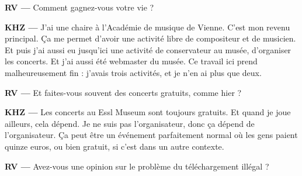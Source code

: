 \documentclass[a4paper,12pt]{article}
\begin{document}
\textbf{RV ---} Comment gagnez-vous votre vie ?

\textbf{KHZ ---} J'ai une chaire à l'Académie de musique de Vienne. C'est mon revenu principal. Ça me permet d'avoir une activité libre de compositeur et de musicien. Et puis j'ai aussi eu jusqu'ici une activité de conservateur au musée, d'organiser les concerts. Et j'ai aussi été webmaster du musée. Ce travail ici prend malheureusement fin : j'avais trois activités, et je n'en ai plus que deux.

\textbf{RV ---} Et faites-vous souvent des concerts gratuits, comme hier ?

\textbf{KHZ ---} Les concerts au Essl Museum sont toujours gratuits. Et quand je joue ailleurs, cela dépend. Je ne suis pas l'organisateur, donc ça dépend de l'organisateur. Ça peut être un événement parfaitement normal où les gens paient quinze euros, ou bien gratuit, si c'est dans un autre contexte.

\textbf{RV ---} Avez-vous une opinion sur le problème du téléchargement illégal ?
\end{document}
